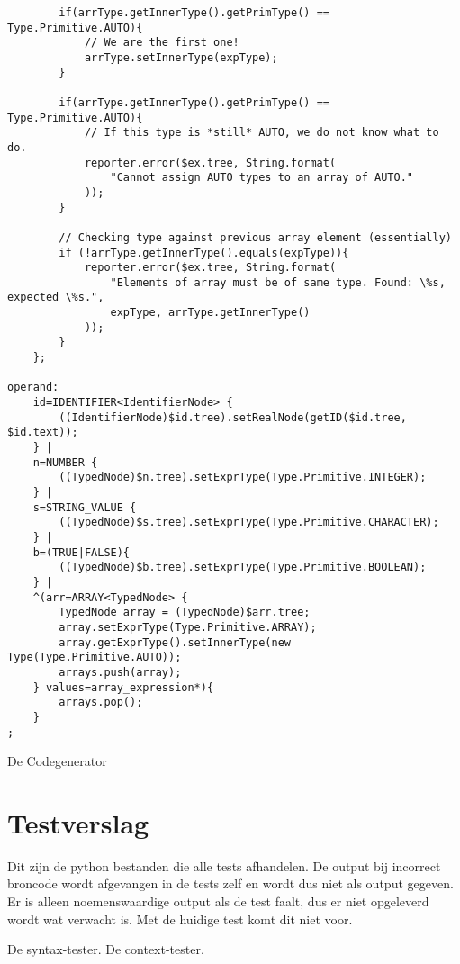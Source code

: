 \begin{landscape}
\begin{lstlisting}
        if(arrType.getInnerType().getPrimType() == Type.Primitive.AUTO){
            // We are the first one!
            arrType.setInnerType(expType);
        }

        if(arrType.getInnerType().getPrimType() == Type.Primitive.AUTO){
            // If this type is *still* AUTO, we do not know what to do.
            reporter.error($ex.tree, String.format(
                "Cannot assign AUTO types to an array of AUTO."
            ));
        }

        // Checking type against previous array element (essentially)
        if (!arrType.getInnerType().equals(expType)){
            reporter.error($ex.tree, String.format(
                "Elements of array must be of same type. Found: \%s, expected \%s.",
                expType, arrType.getInnerType()
            ));
        }
    };

operand:
    id=IDENTIFIER<IdentifierNode> {
        ((IdentifierNode)$id.tree).setRealNode(getID($id.tree, $id.text));
    } |
    n=NUMBER {
        ((TypedNode)$n.tree).setExprType(Type.Primitive.INTEGER);
    } |
    s=STRING_VALUE {
        ((TypedNode)$s.tree).setExprType(Type.Primitive.CHARACTER);
    } |
    b=(TRUE|FALSE){
        ((TypedNode)$b.tree).setExprType(Type.Primitive.BOOLEAN);
    } |
    ^(arr=ARRAY<TypedNode> {
        TypedNode array = (TypedNode)$arr.tree;
        array.setExprType(Type.Primitive.ARRAY);
        array.getExprType().setInnerType(new Type(Type.Primitive.AUTO));
        arrays.push(array);
    } values=array_expression*){
        arrays.pop();
    } 
;
\end{lstlisting}

De Codegenerator

\clearpage

\section{Testverslag} %
\label{sec:testverslag}
Dit zijn de python bestanden die alle tests afhandelen. De output bij incorrect broncode wordt afgevangen in de tests zelf en wordt dus niet als output gegeven. Er is alleen noemenswaardige output als de test faalt, dus er niet opgeleverd wordt wat verwacht is. Met de huidige test komt dit niet voor.

De syntax-tester.
De context-tester.


\end{landscape}
